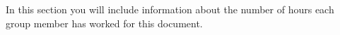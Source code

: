 In this section you will include information about the number of hours each group member has worked for this document.